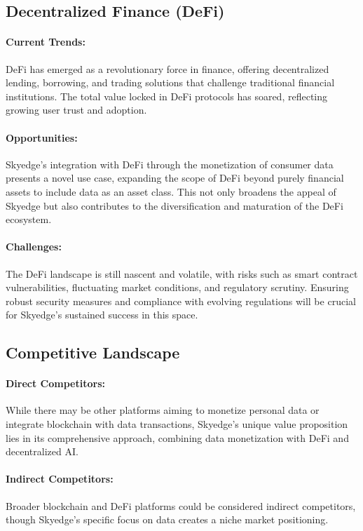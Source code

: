 \documentclass{article}
\begin{document}
\subsection{Decentralized Finance (DeFi)}

\paragraph{Current Trends:} DeFi has emerged as a revolutionary force in finance, offering decentralized lending, borrowing, and trading solutions that challenge traditional financial institutions. The total value locked in DeFi protocols has soared, reflecting growing user trust and adoption.

\paragraph{Opportunities:} Skyedge's integration with DeFi through the monetization of consumer data presents a novel use case, expanding the scope of DeFi beyond purely financial assets to include data as an asset class. This not only broadens the appeal of Skyedge but also contributes to the diversification and maturation of the DeFi ecosystem.

\paragraph{Challenges:} The DeFi landscape is still nascent and volatile, with risks such as smart contract vulnerabilities, fluctuating market conditions, and regulatory scrutiny. Ensuring robust security measures and compliance with evolving regulations will be crucial for Skyedge's sustained success in this space.

\subsection{Competitive Landscape}

\paragraph{Direct Competitors:} While there may be other platforms aiming to monetize personal data or integrate blockchain with data transactions, Skyedge's unique value proposition lies in its comprehensive approach, combining data monetization with DeFi and decentralized AI.

\paragraph{Indirect Competitors:} Broader blockchain and DeFi platforms could be considered indirect competitors, though Skyedge's specific focus on data creates a niche market positioning.
\end{document}
